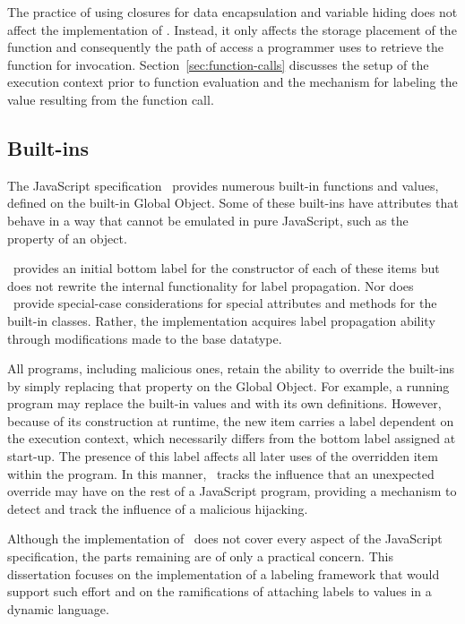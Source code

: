 The practice of using closures for data encapsulation and variable hiding does not affect the implementation of \FlowCore.
Instead, it only affects the storage placement of the function and consequently the path of access a programmer uses to retrieve the function for invocation.
Section~\ref{sec:function-calls} discusses the setup of the execution context prior to function evaluation and the mechanism for labeling the value resulting from the function call.

\subsection{Built-ins}

The JavaScript specification~\cite{ecma} provides numerous built-in functions and values, defined on the built-in Global Object.
Some of these built-ins have attributes that behave in a way that cannot be emulated in pure JavaScript, such as the  property of an  object.

\FlowCore\ provides an initial bottom label for the constructor of each of these items but does not rewrite the internal functionality for label propagation.
Nor does \FlowCore\ provide special-case considerations for special attributes and methods for the built-in classes.
Rather, the implementation acquires label propagation ability through modifications made to the base  datatype.

All programs, including malicious ones, retain the ability to override the built-ins by simply replacing that property on the Global Object.
For example, a running program may replace the built-in values  and  with its own definitions.
However, because of its construction at runtime, the new item carries a label dependent on the execution context, which necessarily differs from the bottom label assigned at start-up.
The presence of this label affects all later uses of the overridden item within the program.
In this manner, \FlowCore\ tracks the influence that an unexpected override may have on the rest of a JavaScript program, providing a mechanism to detect and track the influence of a malicious hijacking.

Although the implementation of \FlowCore\ does not cover every aspect of the JavaScript specification, the parts remaining are of only a practical concern.
This dissertation focuses on the implementation of a labeling framework that would support such effort and on the ramifications of attaching labels to values in a dynamic language.

